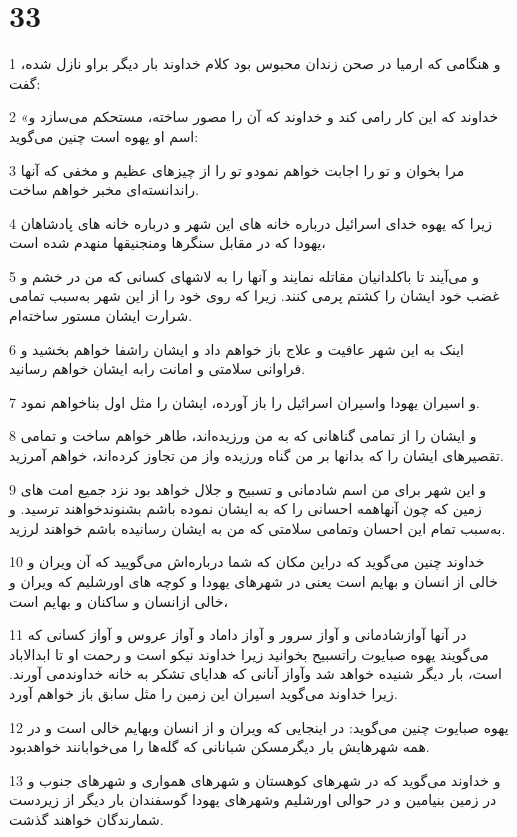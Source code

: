 \chapter{33}

\par 1 و هنگامی که ارمیا در صحن زندان محبوس بود کلام خداوند بار دیگر براو نازل شده، گفت:
\par 2 «خداوند که این کار رامی کند و خداوند که آن را مصور ساخته، مستحکم می‌سازد و اسم او یهوه است چنین می‌گوید:
\par 3 مرا بخوان و تو را اجابت خواهم نمودو تو را از چیزهای عظیم و مخفی که آنها راندانسته‌ای مخبر خواهم ساخت.
\par 4 زیرا که یهوه خدای اسرائیل درباره خانه های این شهر و درباره خانه های پادشاهان یهودا که در مقابل سنگرها ومنجنیقها منهدم شده است،
\par 5 و می‌آیند تا باکلدانیان مقاتله نمایند و آنها را به لاشهای کسانی که من در خشم و غضب خود ایشان را کشتم پرمی کنند. زیرا که روی خود را از این شهر به‌سبب تمامی شرارت ایشان مستور ساخته‌ام.
\par 6 اینک به این شهر عافیت و علاج باز خواهم داد و ایشان راشفا خواهم بخشید و فراوانی سلامتی و امانت رابه ایشان خواهم رسانید.
\par 7 و اسیران یهودا واسیران اسرائیل را باز آورده، ایشان را مثل اول بناخواهم نمود.
\par 8 و ایشان را از تمامی گناهانی که به من ورزیده‌اند، طاهر خواهم ساخت و تمامی تقصیرهای ایشان را که بدانها بر من گناه ورزیده واز من تجاوز کرده‌اند، خواهم آمرزید.
\par 9 و این شهر برای من اسم شادمانی و تسبیح و جلال خواهد بود نزد جمیع امت های زمین که چون آنهاهمه احسانی را که به ایشان نموده باشم بشنوندخواهند ترسید. و به‌سبب تمام این احسان وتمامی سلامتی که من به ایشان رسانیده باشم خواهند لرزید.
\par 10 خداوند چنین می‌گوید که دراین مکان که شما درباره‌اش می‌گویید که آن ویران و خالی از انسان و بهایم است یعنی در شهرهای یهودا و کوچه های اورشلیم که ویران و خالی ازانسان و ساکنان و بهایم است،
\par 11 در آنها آوازشادمانی و آواز سرور و آواز داماد و آواز عروس و آواز کسانی که می‌گویند یهوه صبایوت راتسبیح بخوانید زیرا خداوند نیکو است و رحمت او تا ابدالاباد است، بار دیگر شنیده خواهد شد وآواز آنانی که هدایای تشکر به خانه خداوندمی آورند. زیرا خداوند می‌گوید اسیران این زمین را مثل سابق باز خواهم آورد.
\par 12 یهوه صبایوت چنین می‌گوید: در اینجایی که ویران و از انسان وبهایم خالی است و در همه شهرهایش بار دیگرمسکن شبانانی که گله‌ها را می‌خوابانند خواهدبود.
\par 13 و خداوند می‌گوید که در شهرهای کوهستان و شهرهای همواری و شهرهای جنوب و در زمین بنیامین و در حوالی اورشلیم وشهرهای یهودا گوسفندان بار دیگر از زیردست شمارندگان خواهند گذشت.
